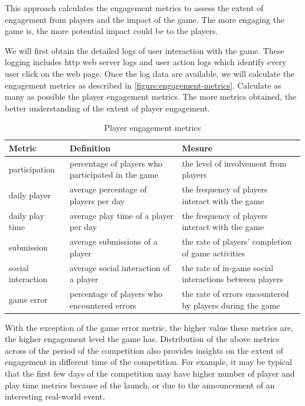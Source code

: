 \documentclass[11pt,oneside]{book}
\newcommand\tabhead[1]{\small\textbf{#1}}
\begin{document}
This approach calculates the engagement metrics to assess the extent of engagement from players and the impact of the game. The more engaging the game is, the more potential impact could be to the players.

We will first obtain the detailed logs of user interaction with the game. These logging includes http web server logs and user action logs which identify every user click on the web page. Once the log data are available, we will calculate the engagement metrics as described in \autoref{figure:engagement-metrics}. Calculate as many as possible the player engagement metrics. The more metrics obtained, the better understanding of the extent of player engagement.

\begin{table}[ht!]
  \centering
    \begin{tabular}{|p{}|p{}|p{}|}
    \hline
    \tabhead{Metric} &
    \tabhead{Definition} &
    \tabhead{Mesure} \\
    \hline
    participation &
    percentage of players who participated in the game  &
    the level of involvement from players \\
    \hline
    daily player &
    average percentage of players per day &
    the frequency of players interact with the game \\
    \hline
    daily play time &
    average play time of a player per day &
    the frequency of players interact with the game \\
    \hline
    submission &
    average submissions of a player &
    the rate of players' completion of game activities \\
    \hline
    social interaction &
    average social interaction of a player &
    the rate of in-game social interactions between players\\
    \hline
    game error &
    percentage of players who encountered errors &
    the rate of errors encountered by players during the game \\
    \hline
  \end{tabular}
  \caption{Player engagement metrics}
  \label{figure:engagement-metrics}
\end{table}

With the exception of the game error metric, the higher value these metrics are, the higher engagement level the game has. 
Distribution of the above metrics across of the period of the competition also provides insights on 
the extent of engagement in different time of the competition. For example, it may be typical that
the first few days of the competition may have higher number of player and play time metrics because 
of the launch, or due to the announcement of an interesting real-world event. 
\end{document}
